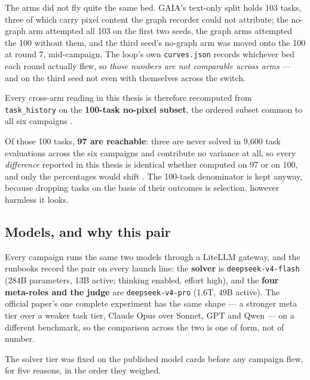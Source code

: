The arms did not fly quite the same bed. GAIA's text-only split holds 103
tasks, three of which carry pixel content the graph recorder could not
attribute; the no-graph arm attempted all 103 on the first two seeds, the
graph arms attempted the 100 without them, and the third seed's no-graph
arm was moved onto the 100 at round 7, mid-campaign. The loop's own
\texttt{curves.json} records whichever bed each round actually flew, so
\emph{those numbers are not comparable across arms} --- and on the third
seed not even with themselves across the switch.

Every cross-arm reading in this thesis is therefore recomputed from
\texttt{task\_history} on the \textbf{100-task no-pixel subset}, the
ordered subset common to all six campaigns .

Of those 100 tasks, \textbf{97 are reachable}: three are never solved in
9{,}600 task evaluations across the six campaigns and contribute no
variance at all, so every \emph{difference} reported in this thesis is
identical whether computed on 97 or on 100, and only the percentages would
shift . The 100-task denominator is kept anyway, because dropping
tasks on the basis of their outcomes is selection, however harmless it
looks.

\subsection*{Models, and why this pair}

Every campaign runs the same two models through a LiteLLM gateway, and the
runbooks record the pair on every launch line: the \textbf{solver} is
\texttt{deepseek-v4-flash} (284B parameters, 13B active; thinking enabled,
effort high), and the \textbf{four meta-roles and the judge} are
\texttt{deepseek-v4-pro} (1.6T, 49B active). The official paper's one
complete experiment has the same shape --- a stronger meta tier over a
weaker task tier, Claude Opus over Sonnet, GPT and Qwen --- on a different
benchmark, so the comparison across the two is one of form, not of
number.

The solver tier was fixed on the published model cards before any
campaign flew, for five reasons, in the order they weighed.

